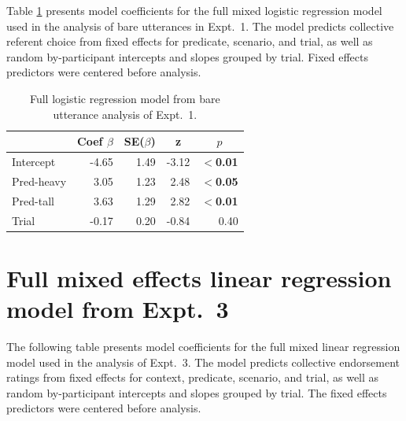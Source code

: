 \documentclass[linguex]{sp}
\begin{document}
Table \ref{expt1analysis2} presents model coefficients for the full mixed logistic regression model used in the analysis of bare utterances in Expt.~1. The model predicts collective referent choice from fixed effects for predicate, scenario, and trial, as well as random by-participant intercepts and slopes grouped by trial. Fixed effects predictors were centered before analysis.


\begin{table}[h!] 
	\centering \caption{Full logistic regression model from bare utterance analysis of Expt.~1.} \label{expt1analysis2}
	\begin{tabular}{lrrrr}\toprule
		&	Coef $\beta$	&	SE($\beta$)	&	\multicolumn{1}{c}{ \textbf{z}}	&	\multicolumn{1}{c}{$p$}\\ \midrule
		Intercept	&	-4.65	&	1.49	&	-3.12	&	\textbf{$<$0.01}\\
		Pred-heavy	&	3.05	&	1.23	&	2.48	&	\textbf{$<$0.05}\\
		Pred-tall	&	3.63	&	1.29	&	2.82	&	\textbf{$<$0.01}\\
		Trial	&	-0.17	&	0.20	&	-0.84	&	0.40\\
		\bottomrule
	\end{tabular}
\end{table}
 


\section{Full mixed effects linear regression model from Expt.~3}\label{expt2results}

The following table presents model coefficients for the full mixed linear regression model used in the analysis of Expt.~3. The model predicts collective endorsement ratings from fixed effects for context, predicate, scenario, and trial, as well as random by-participant intercepts and slopes grouped by trial. The fixed effects predictors were centered before analysis.
\end{document}
